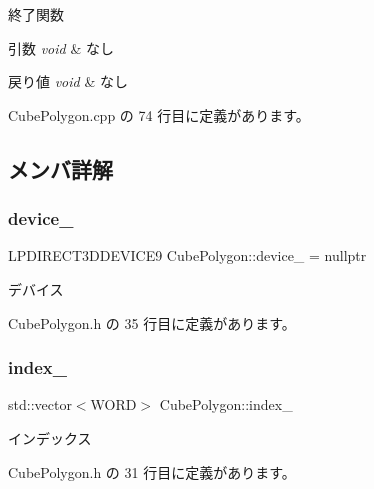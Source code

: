 終了関数 


\begin{DoxyParams}{引数}
{\em void} & なし \\
\hline
\end{DoxyParams}

\begin{DoxyRetVals}{戻り値}
{\em void} & なし \\
\hline
\end{DoxyRetVals}


 Cube\+Polygon.\+cpp の 74 行目に定義があります。



\subsection{メンバ詳解}
\mbox{\label{class_cube_polygon_a769fe3f6b4695d5bf4823489b76ea805}} 
\subsubsection{\texorpdfstring{device\+\_\+}{device\_}}
{\footnotesize\ttfamily L\+P\+D\+I\+R\+E\+C\+T3\+D\+D\+E\+V\+I\+C\+E9 Cube\+Polygon\+::device\+\_\+ = nullptr\hspace{0.3cm}{\ttfamily [private]}}



デバイス 



 Cube\+Polygon.\+h の 35 行目に定義があります。

\mbox{\label{class_cube_polygon_ac1405f52ed52453068575f2fb8d420a5}} 
\subsubsection{\texorpdfstring{index\+\_\+}{index\_}}
{\footnotesize\ttfamily std\+::vector$<$W\+O\+RD$>$ Cube\+Polygon\+::index\+\_\+\hspace{0.3cm}{\ttfamily [private]}}



インデックス 



 Cube\+Polygon.\+h の 31 行目に定義があります。

